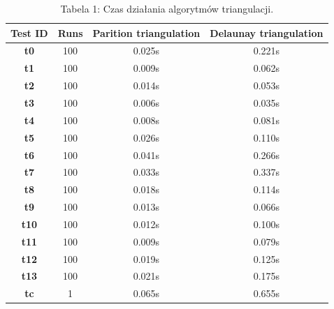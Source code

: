\documentclass[12pt]{article}
\begin{document}
\begin{table}[htp]
	\centering
	\begin{tabular}{|c|ccc|}
		\hline
		\textbf{Test ID} & \textbf{Runs} & \textbf{Parition triangulation} & \textbf{Delaunay triangulation} \\ \hline
		\textbf{t0} & 100 & 0.025s & 0.221s \\ 
		\textbf{t1} & 100 & 0.009s & 0.062s \\ 
		\textbf{t2} & 100 & 0.014s & 0.053s \\ 
		\textbf{t3} & 100 & 0.006s & 0.035s \\ 
		\textbf{t4} & 100 & 0.008s & 0.081s \\ 
		\textbf{t5} & 100 & 0.026s & 0.110s \\ 
		\textbf{t6} & 100 & 0.041s & 0.266s \\ 
		\textbf{t7} & 100 & 0.033s & 0.337s \\ 
		\textbf{t8} & 100 & 0.018s & 0.114s \\ 
		\textbf{t9} & 100 & 0.013s & 0.066s \\ 
		\textbf{t10} & 100 & 0.012s & 0.100s \\ 
		\textbf{t11} & 100 & 0.009s & 0.079s \\ 
		\textbf{t12} & 100 & 0.019s & 0.125s \\ 
		\textbf{t13} & 100 & 0.021s & 0.175s \\ 
		\textbf{tc} & 1 & 0.065s & 0.655s \\ \hline
	\end{tabular}
	\caption*{Tabela 1: Czas działania algorytmów triangulacji.}
\end{table}
\end{document}
